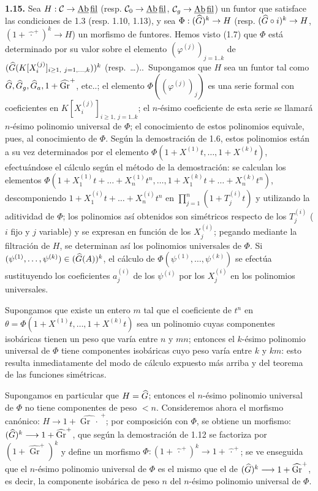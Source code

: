 \textbf{1.15.} Sea \(H:\mathcal C\to\underline{\mathrm{Ab}}\,\underline{\mathrm{fil}}\) (resp. \(\mathcal C_0\to\underline{\mathrm{Ab}}\,\underline{\mathrm{fil}}\), \(\mathcal C_g\to\underline{\mathrm{Ab}}\,\underline{\mathrm{fil}}\)) un funtor que satisface las condiciones de 1.3 (resp. 1.10, 1.13), y sea \(\Phi:(\widehat G)^k\to H\) (resp. \((\widehat G\circ i)^k\to H\), \((1+\widehat{\,\cdot\,}^{+})^k\to H\)) un morfismo de funtores. Hemos visto (1.7) que \(\Phi\) está determinado por su valor sobre el elemento \((\varphi^{(j)})_{j=1..k}\) de \((\Ghat(K[X_i^{(j)}]_{i\geq1,\ j=1,\ldots,k}))^k\) (resp.\ \ldots)..\ Supongamos que \(H\) sea un funtor tal como \(\widehat G,\widehat G_g,\widehat G_a,1+\widehat{\operatorname{Gr}}^{+}\), etc..; el elemento \(\Phi((\varphi^{(j)})_{j})\) es una serie formal con coeficientes en \(K[X_i^{(j)}]_{i\geq1,\ j=1..k}\); el \(n\)-ésimo coeficiente de esta serie se llamará \(n\)-ésimo polinomio universal de \(\Phi\); el conocimiento de estos polinomios equivale, pues, al conocimiento de \(\Phi\). Según la demostración de 1.6, estos polinomios están a su vez determinados por el elemento \(\Phi(1+X^{(1)}t,\ldots,1+X^{(k)}t)\), efectuándose el cálculo según el método de la demostración: se calculan los elementos \(\Phi(1+X_1^{(1)}t+\ldots+X_n^{(1)}t^n,\ldots,1+X_1^{(k)}t+\ldots+X_n^{(k)}t^n)\), descomponiendo \(1+X_1^{(i)}t+\ldots+X_n^{(i)}t^n\) en \(\prod_{j=1}^{n}(1+T_j^{(i)}t)\) y utilizando la aditividad de \(\Phi\); los polinomios así obtenidos son simétricos respecto de los \(T_j^{(i)}\) (\(i\) fijo y \(j\) variable) y se expresan en función de los \(X_j^{(i)}\); pegando mediante la filtración de \(H\), se determinan así los polinomios universales de \(\Phi\). Si \((\psi^{(1)},\ldots,\psi^{(k)})\in(\widehat G(A))^k\), el cálculo de \(\Phi(\psi^{(1)},\ldots,\psi^{(k)})\) se efectúa sustituyendo los coeficientes \(a_j^{(i)}\) de los \(\psi^{(i)}\) por los \(X_j^{(i)}\) en los polinomios universales.

Supongamos que existe un entero \(m\) tal que el coeficiente de \(t^n\) en \(\theta=\Phi(1+X^{(1)}t,\ldots,1+X^{(k)}t)\) sea un polinomio cuyas componentes isobáricas tienen un peso que varía entre \(n\) y \(mn\); entonces el \(k\)-ésimo polinomio universal de \(\Phi\) tiene componentes isobáricas cuyo peso varía entre \(k\) y \(km\): esto resulta inmediatamente del modo de cálculo expuesto más arriba y del teorema de las funciones simétricas.

Supongamos en particular que \(H=\widehat G\); entonces el \(n\)-ésimo polinomio universal de \(\Phi\) no tiene componentes de peso \(<n\). Consideremos ahora el morfismo canónico: \(H\longrightarrow1+\widehat{\operatorname{Gr}\,\cdot\,}^{+}\); por composición con \(\Phi\), se obtiene un morfismo: \((\widehat G)^k\longrightarrow1+\widehat{\operatorname{Gr}}^{+}\), que según la demostración de 1.12 se factoriza por \((1+\widehat{\operatorname{Gr}}^{+})^k\) y define un morfismo \(\Phi:(1+\widehat{\,\cdot\,}^{+})^k\longrightarrow1+\widehat{\,\cdot\,}^{+}\); se ve enseguida que el \(n\)-ésimo polinomio universal de \(\Phi\) es el mismo que el de \((\widehat G)^k\longrightarrow1+\widehat{\operatorname{Gr}}^{+}\), es decir, la componente isobárica de peso \(n\) del \(n\)-ésimo polinomio universal de \(\Phi\).

